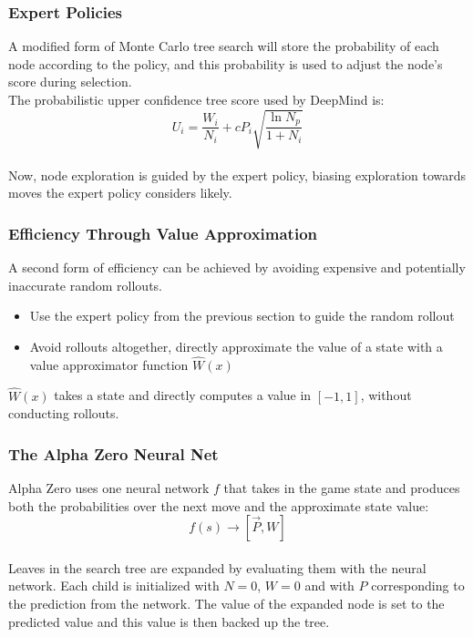 \documentclass[notheorems, aspectratio=54]{beamer}
\newcommand{\reditem}[1]{\setbeamercolor{item}{fg=red}\item #1}
\begin{document}
\begin{frame}
    \frametitle{Expert Policies}
    A modified form of Monte Carlo tree search will store the probability of each node according to the policy, and this probability is used to adjust the node's score during selection.
    \\[2em]
    The probabilistic upper confidence tree score used by DeepMind is:
    $$
    U_i = \frac{W_i}{N_i} + cP_i\sqrt{\frac{\ln N_p}{1+N_i}}
    $$
    \\[2em]
    Now, node exploration is guided by the expert policy, biasing exploration towards moves the expert policy considers likely.
\end{frame}

\begin{frame}
    \frametitle{Efficiency Through Value Approximation}

    A second form of efficiency can be achieved by avoiding expensive and potentially inaccurate random rollouts.
    \\[1em]
    \begin{itemize}
        \reditem Use the expert policy from the previous section to guide the random rollout
        \reditem Avoid rollouts altogether, directly approximate the value of a state with a value approximator function $\hat{W}(x)$
        \\[2em]
    \end{itemize}
    

    $\hat{W}(x)$ takes a state and directly computes a value in $[-1, 1]$, without conducting rollouts.
\end{frame}

\begin{frame}
    \frametitle{The Alpha Zero Neural Net}

    Alpha Zero uses one neural network $f$ that takes in the game state and produces both the probabilities over the next move and the approximate state value:
    \\[.2em]
    $$
    f(s) \rightarrow [\vec P, W] 
    $$
    \\[1em]
    Leaves in the search tree are expanded by evaluating them with the neural network. Each child is initialized with $N=0$, $W=0$ and with $P$ corresponding to the prediction from the network. The value of the expanded node is set to the predicted value and this value is then backed up the tree.
\end{frame}
\end{document}
